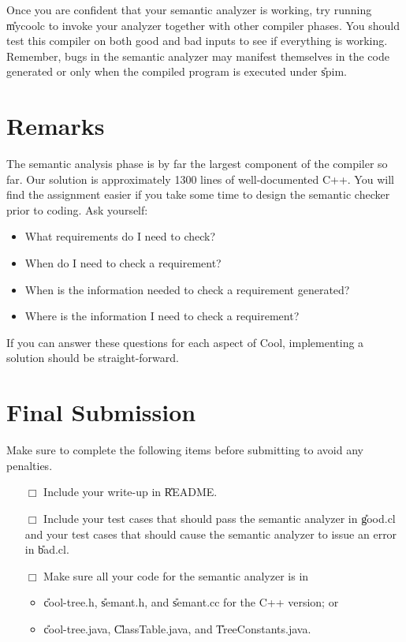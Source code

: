 \documentclass[11pt]{article}
\begin{document}
Once you are confident that your semantic analyzer is working, try running
\U{mycoolc} to invoke your analyzer together with other compiler
phases. You should test this compiler on both good and bad inputs to see
if everything is working. Remember, bugs in the semantic analyzer may
manifest themselves in the code generated or only when the compiled
program is executed under \U{spim}.



\section{Remarks}
\label{check}

The semantic analysis phase is by far the largest component of the
compiler so far.  Our solution is approximately 1300 lines of
well-documented C++.  You will find the assignment easier if you take
some time to design the semantic checker prior to coding.  Ask yourself:

\begin{itemize}
\item What requirements do I need to check?
\item When do I need to check a requirement?
\item When is the information needed to check a requirement generated?
\item Where is the information I need to check a requirement?
\end{itemize}

If you can answer these questions for each aspect of Cool, implementing
a solution should be straight-forward.  

\section{Final Submission}	

Make sure to complete the following items before submitting to avoid
any penalties.

\begin{minipage}{0.8\linewidth}
\bigskip
\begin{itemize}
  \item[$\Box$]
    Include your write-up in \U{README}.

  \item[$\Box$]
    Include your test cases that should pass the semantic analyzer in
    \U{good.cl} and your test cases that should cause the semantic
    analyzer to issue an error in \U{bad.cl}.

  \item[$\Box$]
    Make sure all your code for the semantic analyzer is in
    \begin{itemize}
    \item \U{cool-tree.h}, \U{semant.h}, and
          \U{semant.cc} for the C++ version; or
    \item \U{cool-tree.java}, \U{ClassTable.java}, and
          \U{TreeConstants.java}. %
    \end{itemize}

\end{itemize}
\end{minipage}
\end{document}
